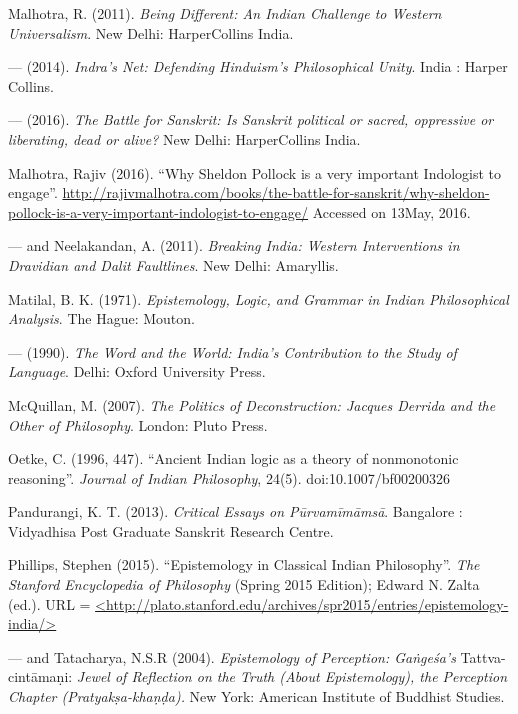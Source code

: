 \begin{thebibliography}{99}
Malhotra, R. (2011). {\sl Being Different: An Indian Challenge to Western Universalism}. New Delhi: HarperCollins  India. 

--- (2014). {\sl Indra's Net: Defending Hinduism's Philosophical Unity}. India : Harper Collins.

--- (2016). {\sl The Battle for Sanskrit: Is Sanskrit political or sacred, oppressive or liberating, dead or alive?} New Delhi: HarperCollins India.

Malhotra, Rajiv  (2016). ``Why Sheldon Pollock is a very important Indologist to engage''. \url{http://rajivmalhotra.com/books/the-battle-for-sanskrit/why-sheldon-pollock-is-a-very-important-indologist-to-engage/} Accessed on 13May, 2016.

--- and Neelakandan, A. (2011). {\sl Breaking India: Western Interventions in Dravidian and Dalit Faultlines}. New Delhi: Amaryllis.

Matilal, B. K. (1971). {\sl Epistemology, Logic, and Grammar in Indian Philosophical Analysis}. The Hague: Mouton.

--- (1990). {\sl The Word and the World: India's Contribution to the Study of Language}. Delhi: Oxford University Press.

McQuillan, M. (2007). {\sl The Politics of Deconstruction: Jacques Derrida and the Other of Philosophy}. London: Pluto Press.

Oetke, C. (1996, 447). ``Ancient Indian logic as a theory of nonmonotonic reasoning''. {\sl Journal of Indian Philosophy}, 24(5). doi:10.1007/bf00200326


Pandurangi, K. T. (2013). {\sl Critical Essays on Pūrvamīmāmsā}. Bangalore : Vidyadhisa Post Graduate Sanskrit Research Centre.

Phillips, Stephen (2015). ``Epistemology in Classical Indian Philosophy''. {\sl The Stanford Encyclopedia of Philosophy} (Spring 2015 Edition); Edward N. Zalta (ed.). URL = \url{<http://plato.stanford.edu/archives/spr2015/entries/epistemology-india/>}

--- and Tatacharya, N.S.R (2004). {\sl Epistemology of Perception: Gaṅgeśa's} Tattva-cintāmaṇi: {\em Jewel of Reflection on the Truth (About Epistemology), the Perception Chapter (Pratyakṣa-khaṇḍa).} New York: American Institute of Buddhist Studies.


\end{thebibliography}
